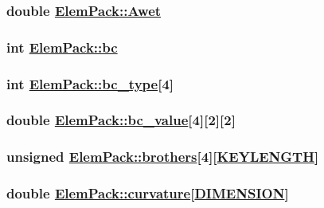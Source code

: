 \hypertarget{structElemPack_o45}{
\subsubsection[Awet]{\setlength{\rightskip}{0pt plus 5cm}double \hyperlink{structElemPack_o45}{Elem\-Pack::Awet}}}
\label{structElemPack_o45}


\hypertarget{structElemPack_o14}{
\subsubsection[bc]{\setlength{\rightskip}{0pt plus 5cm}int \hyperlink{structElemPack_o14}{Elem\-Pack::bc}}}
\label{structElemPack_o14}


\hypertarget{structElemPack_o15}{
\subsubsection[bc\_\-type]{\setlength{\rightskip}{0pt plus 5cm}int \hyperlink{structElemPack_o15}{Elem\-Pack::bc\_\-type}\mbox{[}4\mbox{]}}}
\label{structElemPack_o15}


\hypertarget{structElemPack_o29}{
\subsubsection[bc\_\-value]{\setlength{\rightskip}{0pt plus 5cm}double \hyperlink{structElemPack_o29}{Elem\-Pack::bc\_\-value}\mbox{[}4\mbox{]}\mbox{[}2\mbox{]}\mbox{[}2\mbox{]}}}
\label{structElemPack_o29}


\hypertarget{structElemPack_o24}{
\subsubsection[brothers]{\setlength{\rightskip}{0pt plus 5cm}unsigned \hyperlink{structElemPack_o24}{Elem\-Pack::brothers}\mbox{[}4\mbox{]}\mbox{[}\hyperlink{constant_8h_a10}{KEYLENGTH}\mbox{]}}}
\label{structElemPack_o24}


\hypertarget{structElemPack_o38}{
\subsubsection[curvature]{\setlength{\rightskip}{0pt plus 5cm}double \hyperlink{structElemPack_o38}{Elem\-Pack::curvature}\mbox{[}\hyperlink{constant_8h_a15}{DIMENSION}\mbox{]}}}
\label{structElemPack_o38}


